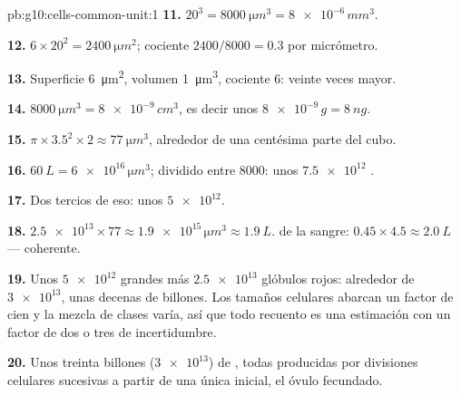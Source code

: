 \begin{solution}{pb:g10:cells-common-unit:1}
\textbf{11.} $20^3 = \qty{8000}{\micro m^3} = \num{8e-6}\,\unit{mm^3}$.

\textbf{12.} $6 \times 20^2 = \qty{2400}{\micro m^2}$; cociente
$2400/8000 = 0.3$ por micrómetro.

\textbf{13.} Superficie \qty{6}{\micro m^2}, volumen \qty{1}{\micro m^3},
cociente 6: veinte veces mayor.

\textbf{14.} $\qty{8000}{\micro m^3} = \num{8e-9}\,\unit{cm^3}$, es
decir unos $\num{8e-9}\,\unit{g} = \qty{8}{ng}$.

\textbf{15.} $\pi \times 3.5^2 \times 2 \approx \qty{77}{\micro m^3}$,
alrededor de una centésima parte del cubo.

\textbf{16.} $\qty{60}{L} = \num{6e16}\,\unit{\micro m^3}$; dividido
entre 8000: unos $\num{7.5e12}$ .

\textbf{17.} Dos tercios de eso: unos $\num{5e12}$.

\textbf{18.} $\num{2.5e13} \times 77 \approx \num{1.9e15}\,\unit{\micro
m^3} \approx \qty{1.9}{L}$.  de la sangre: $0.45 \times 4.5 \approx
\qty{2.0}{L}$ --- coherente.

\textbf{19.} Unos $\num{5e12}$  grandes más $\num{2.5e13}$
glóbulos rojos: alrededor de $\num{3e13}$, unas decenas de billones.
Los tamaños celulares abarcan un factor de cien y la mezcla de clases
varía, así que todo recuento es una estimación con un factor de dos o
tres de incertidumbre.

\textbf{20.} Unos treinta billones ($\num{3e13}$) de , todas
producidas por divisiones celulares sucesivas a partir de una única
 inicial, el óvulo fecundado.
\end{solution}
